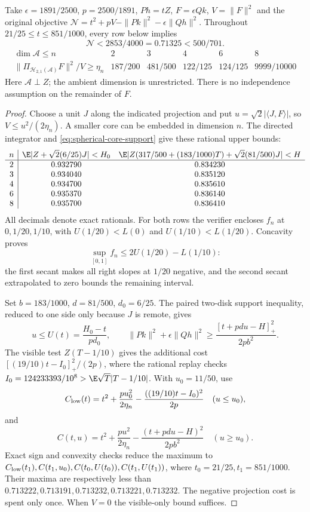 \begin{theorem}
\label{thm:spherical-core-contact}
Take $\epsilon=1891/2500$, $p=2500/1891$, $Ph=tZ$,
$F=\epsilon Qk$, $V=\|F\|^2$ and the original objective
$\mathcal N=t^2+pV-\|Pk\|^2-\epsilon\|Qh\|^2$.
Throughout $21/25\le t\le851/1000$, every row below implies
\[
 \boxed{\mathcal N<2853/4000=0.71325<500/701.}
\]
\[
\begin{array}{c|ccccc}
 \dim\mathcal A\le n&2&3&4&6&8\\\hline
 \|\Pi_{\mathcal H_{2,1}(\mathcal A)}F\|^2/V\ge\eta_n
 &187/200&481/500&122/125&124/125&9999/10000
\end{array}
\]
Here $\mathcal A\perp Z$; the ambient dimension is unrestricted.
There is no independence assumption on the remainder of $F$.
\end{theorem}
\begin{proof}
Choose a unit $J$ along the indicated projection and put
$u=\sqrt2|\langle J,F\rangle|$, so $V\le u^2/(2\eta_n)$.
A smaller core can be embedded in dimension $n$.
The directed integrator and \eqref{eq:spherical-core-support} give
these rational upper bounds:
\[
\begin{array}{c|cc}
 n&\E|Z+\sqrt2(6/25)J|<H_0
 &\E|Z(317/500+(183/1000)T)+\sqrt2(81/500)J|<H\\\hline
 2&0.932790&0.834230\\
 3&0.934040&0.835120\\
 4&0.934700&0.835610\\
 6&0.935370&0.836140\\
 8&0.935700&0.836410
\end{array}
\]
All decimals denote exact rationals. For both rows the verifier
encloses $f_n$ at $0,1/20,1/10$, with
$U(1/20)<L(0)$ and $U(1/10)<L(1/20)$. Concavity proves
\[
 \sup_{[0,1]}f_n\le2U(1/20)-L(1/10):
\]
the first secant makes all right slopes at $1/20$ negative, and the
second secant extrapolated to zero bounds the remaining interval.

Set $b=183/1000$, $d=81/500$, $d_0=6/25$.
The paired two-disk support inequality, reduced to one side only
because $J$ is remote, gives
\[
 u\le U(t)=\frac{H_0-t}{pd_0},\qquad
 \|Pk\|^2+\epsilon\|Qh\|^2
 \ge\frac{[t+pdu-H]_+^2}{2pb^2}.
\]
The visible test $Z(T-1/10)$ gives the additional cost
$[(19/10)t-I_0]_+^2/(2p)$, where the rational replay checks
$I_0=124233393/10^8>\E\sqrt T|T-1/10|$.
With $u_0=11/50$, use
\[
 C_{\rm low}(t)=t^2+\frac{pu_0^2}{2\eta_n}
                  -\frac{((19/10)t-I_0)^2}{2p}
 \quad(u\le u_0),
\]
and
\[
 C(t,u)=t^2+\frac{pu^2}{2\eta_n}
                   -\frac{(t+pdu-H)^2}{2pb^2}
 \quad(u\ge u_0).
\]
Exact sign and convexity checks reduce the maximum to
$C_{\rm low}(t_1),C(t_1,u_0),C(t_0,U(t_0)),C(t_1,U(t_1))$,
where $t_0=21/25,t_1=851/1000$. Their maxima are respectively
less than $0.713222,0.713191,0.713232,0.713221,0.713232$.
The negative projection cost is spent only once. When $V=0$ the
visible-only bound suffices.
\end{proof}


